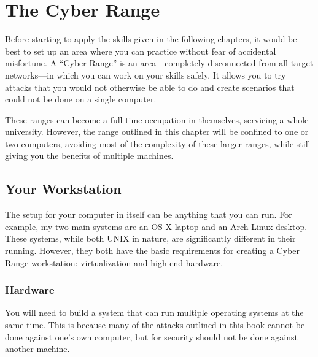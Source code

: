 \chapter{The Cyber Range}
	Before starting to apply the skills given in the following chapters, it would be best to set up an area where you can practice without fear of accidental misfortune\cite{pentestingLabs}.
	A ``Cyber Range'' is an area---completely disconnected from all target networks---in which you can work on your skills safely.
	It allows you to try attacks that you would not otherwise be able to do and create scenarios that could not be done on a single computer.

	These ranges can become a full time occupation in themselves, servicing a whole university.
	However, the range outlined in this chapter will be confined to one or two computers, avoiding most of the complexity of these larger ranges,
	while still giving you the benefits of multiple machines.
	\section{Your Workstation}
		The setup for your computer in itself can be anything that you can run.
		For example, my two main systems are an OS X laptop and an Arch Linux desktop.
		These systems, while both UNIX in nature, are significantly different in their running.
		However, they both have the basic requirements for creating a Cyber Range workstation: virtualization and high end hardware.

		\subsection{Hardware}
			You will need to build a system that can run multiple operating systems at the same time.
			This is because many of the attacks outlined in this book cannot be done against one's own computer,
			but for security should not be done against another machine.


